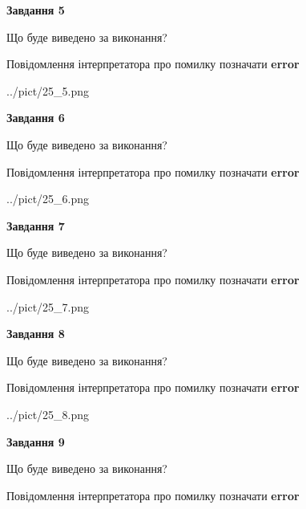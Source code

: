 \documentclass[11pt, ukrainian]{article}
\begin{document}
{\begin {large}
{\begin {center}\textbf{Завдання 5}\end {center}}\par
Що буде виведено за виконання? \par
Повідомлення інтерпретатора про помилку позначати \textbf{error}

\begin{center}
	{../pict/25_5.png}
\end{center}
\newpage

{\begin {center}\textbf{Завдання 6}\end {center}}\par
Що буде виведено за виконання? \par
Повідомлення інтерпретатора про помилку позначати \textbf{error}

\begin{center}
	{../pict/25_6.png}
\end{center}
\newpage

{\begin {center}\textbf{Завдання 7}\end {center}}\par
Що буде виведено за виконання? \par
Повідомлення інтерпретатора про помилку позначати \textbf{error}

\begin{center}
	{../pict/25_7.png}
\end{center}
\newpage

{\begin {center}\textbf{Завдання 8}\end {center}}\par
Що буде виведено за виконання? \par
Повідомлення інтерпретатора про помилку позначати \textbf{error}

\begin{center}
	{../pict/25_8.png}
\end{center}
\newpage

{\begin {center}\textbf{Завдання 9}\end {center}}\par
Що буде виведено за виконання? \par
Повідомлення інтерпретатора про помилку позначати \textbf{error}


\end{large}}
\end{document}
